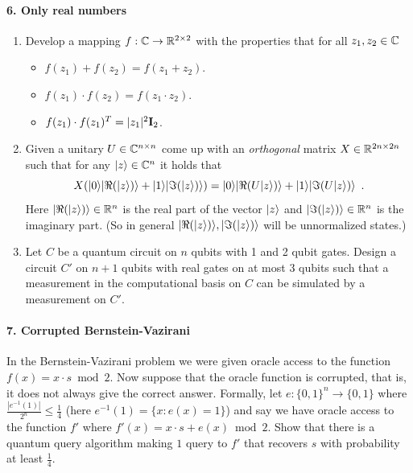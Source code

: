 \paragraph*{6. Only real numbers} 
\begin{enumerate}
  \item Develop a mapping $f: \mathbb{C} \rightarrow \mathbb{R}^{2 \times 2}$ with the properties that for all $z_1, z_2 \in \mathbb{C}$
  \begin{itemize}
    \item $f(z_1) + f(z_2) = f(z_1 + z_2)$.
    \item $f(z_1) \cdot f(z_2) = f(z_1 \cdot z_2)$.
    \item $f(z_1) \cdot f(z_1)^T = |z_1|^2 \mathbf{I}_2$.
  \end{itemize}
  \item Given a unitary $U \in \mathbb{C}^{n \times n}$ come up with an \emph{orthogonal} matrix $X \in \mathbb{R}^{2n \times 2n}$ such that 
  for any $|z\rangle \in \mathbb{C}^n$ it holds that 
  \[
  X(|0\rangle|\Re(|z\rangle)\rangle + |1\rangle|\Im(|z\rangle)\rangle) = |0\rangle |\Re(U|z\rangle)\rangle + |1\rangle|\Im(U|z\rangle)\rangle \enspace .
  \]
  Here $|\Re(|z\rangle)\rangle \in \mathbb{R}^n$ is the real part of the vector $|z\rangle$ and $|\Im(|z\rangle)\rangle \in \mathbb{R}^n$ is the imaginary part.  (So in 
  general $|\Re(|z\rangle)\rangle, |\Im(|z\rangle)\rangle$ will be unnormalized states.)
  \item Let $C$ be a quantum circuit on $n$ qubits with 1 and 2 qubit gates.  Design a circuit $C'$ on 
  $n+1$ qubits with real gates on at most 3 qubits such that a measurement in the computational basis on $C$ can be 
  simulated by a measurement on $C'$.
\end{enumerate}

\paragraph*{7. Corrupted Bernstein-Vazirani}
In the Bernstein-Vazirani problem we were given oracle access to the function $f(x) = x \cdot s \bmod{2}$.  
Now suppose that the oracle function is corrupted, that is, it does not always give the correct answer.   Formally, let $e: \{0,1\}^n \rightarrow \{0,1\}$ where $\frac{|e^{-1}(1)|}{2^n} \le \frac{1}{4}$
(here $e^{-1}(1) = \{x: e(x) = 1\}$) and say we have oracle access to the function $f'$ where $f'(x) = x \cdot s + e(x) \bmod{2}$.  Show that there is a quantum query algorithm 
making $1$ query to $f'$ that recovers $s$ with probability at least $\frac{1}{4}$.





















